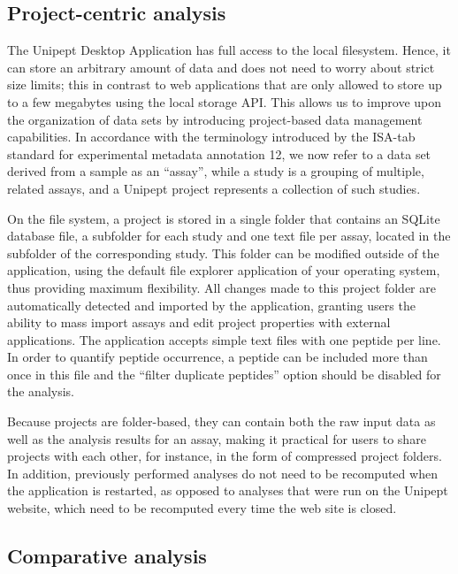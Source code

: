 \hypertarget{project-centric-analysis}{%
\subsection{Project-centric analysis}\label{project-centric-analysis}}

The Unipept Desktop Application has full access to the local filesystem.
Hence, it can store an arbitrary amount of data and does not need to
worry about strict size limits; this in contrast to web applications
that are only allowed to store up to a few megabytes using the local
storage API. This allows us to improve upon the organization of data
sets by introducing project-based data management capabilities. In
accordance with the terminology introduced by the ISA-tab standard for
experimental metadata annotation 12, we now refer to a data set derived
from a sample as an ``assay'', while a study is a grouping of multiple,
related assays, and a Unipept project represents a collection of such
studies.

On the file system, a project is stored in a single folder that contains
an SQLite database file, a subfolder for each study and one text file
per assay, located in the subfolder of the corresponding study. This
folder can be modified outside of the application, using the default
file explorer application of your operating system, thus providing
maximum flexibility. All changes made to this project folder are
automatically detected and imported by the application, granting users
the ability to mass import assays and edit project properties with
external applications. The application accepts simple text files with
one peptide per line. In order to quantify peptide occurrence, a peptide
can be included more than once in this file and the ``filter duplicate
peptides'' option should be disabled for the analysis.

Because projects are folder-based, they can contain both the raw input
data as well as the analysis results for an assay, making it practical
for users to share projects with each other, for instance, in the form
of compressed project folders. In addition, previously performed
analyses do not need to be recomputed when the application is restarted,
as opposed to analyses that were run on the Unipept website, which need
to be recomputed every time the web site is closed.

\hypertarget{comparative-analysis}{%
\subsection{Comparative analysis}\label{comparative-analysis}}

